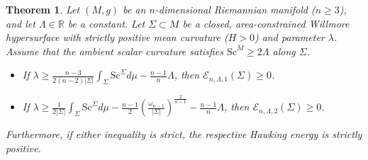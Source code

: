 \documentclass[10pt,a4paper]{amsart}
\newtheorem{theorem}{Theorem}
\begin{document}
\begin{theorem}\label{thm:unified_positivity}
Let $(M,g)$ be an $n$-dimensional Riemannian manifold ($n\geq 3$), and let $\Lambda \in \mathbb{R}$ be a constant. Let $\Sigma \subset M$ be a closed, area-constrained Willmore hypersurface with strictly positive mean curvature ($H > 0$) and parameter $\lambda$. Assume that the ambient scalar curvature satisfies $\mathrm{Sc}^M \ge 2\Lambda$ along $\Sigma$.
\begin{itemize}
    \item[$(i)$] If $\label{unified_bound_1}
    \lambda \geq \frac{n-3}{2(n-2)|\Sigma|} \int_{\Sigma} \mathrm{Sc}^{\Sigma} d\mu - \frac{n-1}{n}\Lambda$,
then $\mathcal{E}_{n,\Lambda,1}(\Sigma)\geq 0$.
    \item[$(ii)$] If $
    \lambda \geq \frac{1}{2|\Sigma|}\int_{\Sigma} \mathrm{Sc}^{\Sigma} d\mu - \frac{n-1}{2} \left( \frac{\omega_{n-1}}{ |\Sigma|} \right)^{\frac{2}{n-1}} - \frac{n-1}{n}\Lambda$,
then $\mathcal{E}_{n,\Lambda,2}(\Sigma)\geq 0$.
\end{itemize}
Furthermore, if either inequality is strict, the respective Hawking energy is strictly positive.
\end{theorem}
\end{document}

